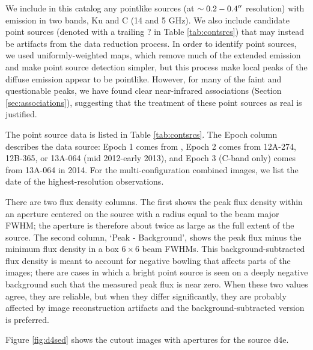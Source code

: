 

We include in this catalog any pointlike sources (at $\sim0.2-0.4\mbox{$^{\prime\prime}$}$
resolution) with emission in two bands, Ku and C (14 and 5 GHz).  We also
include candidate point sources (denoted with a trailing ? in Table
\ref{tab:contsrcs}) that may instead be artifacts from the data reduction
process.  In order to identify point sources, we used
uniformly-weighted maps, which remove much of the extended emission and make
point source detection simpler, but this process make local peaks
of the diffuse emission appear to be pointlike.  However, for many of the
faint and questionable peaks, we have found clear near-infrared associations
(Section \ref{sec:associations}),
suggesting that the treatment of these point sources as real is justified.

The point source data is listed in Table \ref{tab:contsrcs}.  The Epoch column
describes the data source: Epoch 1 comes from \citet{Mehringer1994a}, Epoch 2
comes from 12A-274, 12B-365, or 13A-064 (mid 2012-early
2013), and Epoch 3 (C-band only) comes from
13A-064 in 2014. For the multi-configuration combined images, we list the date
of the highest-resolution observations.

There are two flux density columns.  The first shows the peak flux density
within an aperture centered on the source with a radius equal to the beam major
FWHM; the aperture is therefore about twice as large as the full extent of the
source.  The second column, `Peak - Background', shows the peak flux minus the
minimum flux density in a box $6\times6$ beam FWHMs.  This
background-subtracted flux density is meant to account for negative bowling
that affects parts of the images; there are cases in which a bright point
source is seen on a deeply negative background such that the measured peak flux
is near zero.  When these two values agree, they are reliable, but when they
differ significantly, they are probably affected by image reconstruction
artifacts and the background-subtracted version is preferred.



Figure \ref{fig:d4sed} shows the cutout images with apertures for the source
d4e.  

